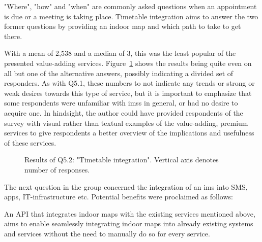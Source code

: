 \begin{displayquote}
"Where", "how" and "when" are commonly asked questions when an appointment is due or a meeting is taking place. Timetable integration aims to answer the two former questions by providing an indoor map and which path to take to get there.
\end{displayquote}

With a mean of 2,538 and a median of 3, this was the least popular of the presented value-adding services. Figure~\ref{fig:q52} shows the results being quite even on all but one of the alternative answers, possibly indicating a divided set of responders. As with Q5.1, these numbers to not indicate any trends or strong or weak desires towards this type of service, but it is important to emphasize that some respondents were unfamiliar with \glspl{ims} in general, or had no desire to acquire one. In hindsight, the author could have provided respondents of the survey with visual rather than textual examples of the value-adding, premium services to give respondents a better overview of the implications and usefulness of these services. 


\begin{figure}[H]
    \centering
    \caption{Results of Q5.2: "Timetable integration". Vertical axis denotes number of responses.}
    \label{fig:q52}
\end{figure}


The next question in the group concerned the integration of an \gls{ims} into SMS, apps, IT-infrastructure etc. Potential benefits were proclaimed as follows:

\begin{displayquote}
An API that integrates indoor maps with the existing services mentioned above, aims to enable seamlessly integrating indoor maps into already existing systems and services without the need to manually do so for every service.
\end{displayquote}

